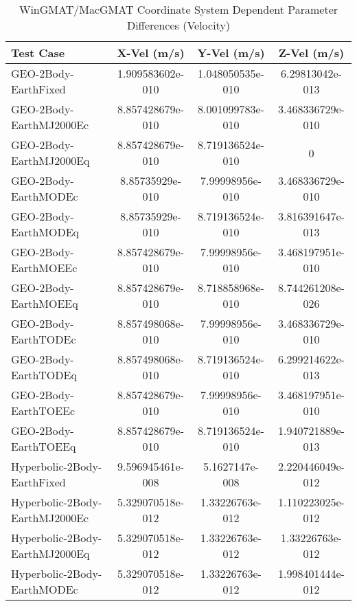\begin{table}[htbp!]
\centering
\caption{ WinGMAT/MacGMAT Coordinate System Dependent Parameter Differences (Velocity)}
      \begin{tabular}{lccc}
      \hline\hline
          Test Case & X-Vel (m/s) & Y-Vel (m/s) & Z-Vel (m/s) \\
         \hline
         GEO-2Body-EarthFixed & 1.909583602e-010 & 1.048050535e-010 & 6.29813042e-013 \\
         GEO-2Body-EarthMJ2000Ec & 8.857428679e-010 & 8.001099783e-010 & 3.468336729e-010 \\
         GEO-2Body-EarthMJ2000Eq & 8.857428679e-010 & 8.719136524e-010 & 0 \\
         GEO-2Body-EarthMODEc & 8.85735929e-010 & 7.99998956e-010 & 3.468336729e-010 \\
         GEO-2Body-EarthMODEq & 8.85735929e-010 & 8.719136524e-010 & 3.816391647e-013 \\
         GEO-2Body-EarthMOEEc & 8.857428679e-010 & 7.99998956e-010 & 3.468197951e-010 \\
         GEO-2Body-EarthMOEEq & 8.857428679e-010 & 8.718858968e-010 & 8.744261208e-026 \\
         GEO-2Body-EarthTODEc & 8.857498068e-010 & 7.99998956e-010 & 3.468336729e-010 \\
         GEO-2Body-EarthTODEq & 8.857498068e-010 & 8.719136524e-010 & 6.299214622e-013 \\
         GEO-2Body-EarthTOEEc & 8.857428679e-010 & 7.99998956e-010 & 3.468197951e-010 \\
         GEO-2Body-EarthTOEEq & 8.857428679e-010 & 8.719136524e-010 & 1.940721889e-013 \\
         Hyperbolic-2Body-EarthFixed & 9.596945461e-008 & 5.1627147e-008 & 2.220446049e-012 \\
         Hyperbolic-2Body-EarthMJ2000Ec & 5.329070518e-012 & 1.33226763e-012 & 1.110223025e-012 \\
         Hyperbolic-2Body-EarthMJ2000Eq & 5.329070518e-012 & 1.33226763e-012 & 1.33226763e-012 \\
         Hyperbolic-2Body-EarthMODEc & 5.329070518e-012 & 1.33226763e-012 & 1.998401444e-012 \\

\end{tabular}
\end{table}
